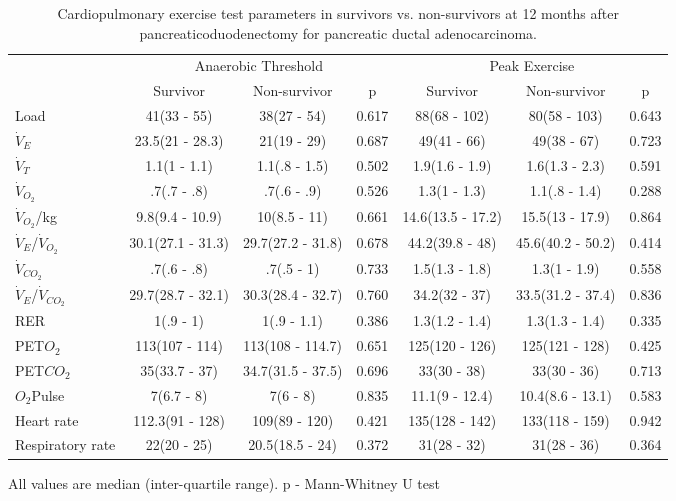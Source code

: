 \begin{sidewaystable}[p]
	\centering
	\caption{Cardiopulmonary exercise test parameters in survivors vs. non-survivors at 12 months after pancreaticoduodenectomy for pancreatic ductal adenocarcinoma. }
	\label{table:cpet_survival_12months}
	\begin{tabular}{l | c c c | c c c}
		                             &    \multicolumn{3}{c}{Anaerobic Threshold}    &       \multicolumn{3}{c}{Peak Exercise}       \\
		                             & Survivor          & Non-survivor      & p     & Survivor          & Non-survivor      & p     \\ \hline
		Load                         & 41(33 - 55)       & 38(27 - 54)       & 0.617 & 88(68 - 102)      & 80(58 - 103)      & 0.643 \\
		$\dot{V}_E$                  & 23.5(21 - 28.3)   & 21(19 - 29)       & 0.687 & 49(41 - 66)       & 49(38 - 67)       & 0.723 \\
		$\dot{V}_T$                  & 1.1(1 - 1.1)      & 1.1(.8 - 1.5)     & 0.502 & 1.9(1.6 - 1.9)    & 1.6(1.3 - 2.3)    & 0.591 \\
		$\dot{V}_{O_2}$              & .7(.7 - .8)       & .7(.6 - .9)       & 0.526 & 1.3(1 - 1.3)      & 1.1(.8 - 1.4)     & 0.288 \\
		$\dot{V}_{O_2}$/kg           & 9.8(9.4 - 10.9)   & 10(8.5 - 11)      & 0.661 & 14.6(13.5 - 17.2) & 15.5(13 - 17.9)   & 0.864 \\
		$\dot{V}_E$/$\dot{V}_{O_2}$  & 30.1(27.1 - 31.3) & 29.7(27.2 - 31.8) & 0.678 & 44.2(39.8 - 48)   & 45.6(40.2 - 50.2) & 0.414 \\
		$\dot{V}_{CO_2}$             & .7(.6 - .8)       & .7(.5 - 1)        & 0.733 & 1.5(1.3 - 1.8)    & 1.3(1 - 1.9)      & 0.558 \\
		$\dot{V}_E$/$\dot{V}_{CO_2}$ & 29.7(28.7 - 32.1) & 30.3(28.4 - 32.7) & 0.760 & 34.2(32 - 37)     & 33.5(31.2 - 37.4) & 0.836 \\
		RER                          & 1(.9 - 1)         & 1(.9 - 1.1)       & 0.386 & 1.3(1.2 - 1.4)    & 1.3(1.3 - 1.4)    & 0.335 \\
		PET$O_2$                     & 113(107 - 114)    & 113(108 - 114.7)  & 0.651 & 125(120 - 126)    & 125(121 - 128)    & 0.425 \\
		PET$CO_2$                    & 35(33.7 - 37)     & 34.7(31.5 - 37.5) & 0.696 & 33(30 - 38)       & 33(30 - 36)       & 0.713 \\
		$O_2$Pulse                   & 7(6.7 - 8)        & 7(6 - 8)          & 0.835 & 11.1(9 - 12.4)    & 10.4(8.6 - 13.1)  & 0.583 \\
		Heart rate                   & 112.3(91 - 128)   & 109(89 - 120)     & 0.421 & 135(128 - 142)    & 133(118 - 159)    & 0.942 \\
		Respiratory rate             & 22(20 - 25)       & 20.5(18.5 - 24)   & 0.372 & 31(28 - 32)       & 31(28 - 36)       & 0.364\\ \hline
	\end{tabular}
	
	
	All values are median (inter-quartile range). p - Mann-Whitney U test
\end{sidewaystable}